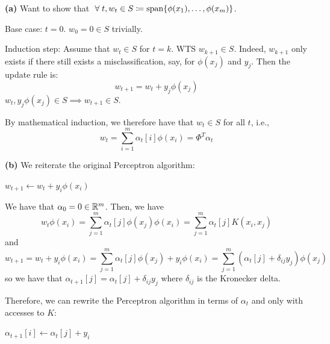 \documentclass[a4paper, 12pt]{article}
\begin{document}
\begin{problem} [Problem 2]
\textbf{(a)} Want to show that $\forall t, w_t \in S \coloneqq \spann\{\phi(x_1), \ldots, \phi(x_m)\}$.

Base case: $t = 0$. $w_0 = 0 \in S$ trivially.

Induction step: Assume that $w_t \in S$ for $t = k$. WTS $w_{k+1} \in S$. Indeed, $w_{k+1}$ only exists if there still exists a misclassification, say, for $\phi(x_j)$ and $y_j$. Then the update rule is:
\begin{equation*}
w_{t+1} = w_t + y_j \phi(x_j)
\end{equation*}
$w_t, y_j \phi(x_j) \in S \implies w_{t+1} \in S$.

By mathematical induction, we therefore have that $w_t \in S$ for all $t$, i.e., \begin{equation*}
w_t = \sum_{i=1}^{m} \alpha_t[i] \phi(x_i) = \Phi^T \alpha_t
\end{equation*}

\textbf{(b)} We reiterate the original Perceptron algorithm:
\begin{algorithmic}[1]
        $w_{t+1} \gets w_t + y_i \phi(x_i)$
    \EndWhile
\end{algorithmic}
\end{problem}
We have that $\alpha_0 = 0 \in \mathbb{R}^m$. Then, we have \begin{equation*}
w_t \phi(x_i) = \sum_{j=1}^{m} \alpha_t[j] \phi(x_j) \phi(x_i) = \sum_{j=1}^{m} \alpha_t[j] K(x_i, x_j)
\end{equation*}
and
\begin{equation*}
w_{t+1} = w_t + y_i \phi(x_i) = \sum_{j=1}^{m} \alpha_t[j]\phi(x_j) + y_i \phi(x_i) = \sum_{j=1}^{m} (\alpha_t[j] + \delta_{ij} y_j) \phi(x_j)
\end{equation*}
so we have that $\alpha_{t+1}[j] = \alpha_t[j] + \delta_{ij} y_j$ where $\delta_{ij}$ is the Kronecker delta.

Therefore, we can rewrite the Perceptron algorithm in terms of $\alpha_t$ and only with accesses to $K$:
\begin{algorithmic}[1]
        $\alpha_{t+1}[i] \gets \alpha_t[j] + y_i$
    \EndWhile
\end{algorithmic}
\end{document}
